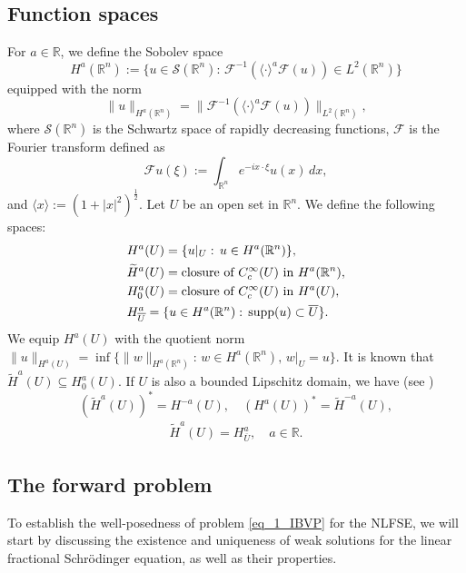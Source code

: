 \documentclass [oneside,11pt] {amsart}
\numberwithin{equation}{section}
\newcommand{\R}{\mathbb{R}}
\newcommand{\supp}{\mathrm{supp}}
\newcommand{\dx}{\,dx}
\begin{document}
\subsection{Function spaces}
For $a\in \R$, we define the Sobolev space 
$$
H^a(\R^n):=\{u\in \mathcal{S}(\R^n):\, \mathcal{F}^{-1}(\langle \cdot\rangle^a\mathcal{F}(u))\in L^2(\R^n)\}
$$
equipped with the norm
\[
\|u\|_{H^a(\R^n)} = \|\mathcal{F}^{-1}(\langle \cdot\rangle^a\mathcal{F}(u))\|_{L^2(\R^n)},
\]
where $\mathcal{S}(\R^n)$ is the Schwartz space of rapidly decreasing functions, $\mathcal{F}$ is the Fourier transform defined as 
\[
\mathcal{F}u(\xi) := \int_{\R^n} e^{-ix\cdot\xi}u(x)\dx ,
\]
and $\langle x\rangle:=(1+|x|^2)^{\frac{1}{2}}$.
Let $U$ be an open set in $\R^n$. We define the following spaces:
\begin{align*}
&H^a(U) = \{u|_{U}: \, u\in H^a(\R^n)\},\\
&\widetilde{H}^a(U) = \hbox{closure of } C^\infty_c(U) \hbox{ in } H^a(\R^n),\\
&H^a_0(U) =  \hbox{closure of } C^\infty_c(U) \hbox{ in } H^a(U),\\
&H^a_{\overline{U}} = \{u\in H^a(\R^n):\,\supp(u)\subset \overline{U}\}.
\end{align*}
We equip $H^a(U)$ with the quotient norm $\|u\|_{H^a(U)} = \inf \{\|w\|_{H^a(\R^n)}:\, w\in H^a(\R^n),\, w|_{U} = u\}$. It is known that $\widetilde{H}^a(U) \subseteq H^a_0(U)$. 
If $U$ is also a bounded Lipschitz domain, we have (see \cite{mclean_strongly_2000})
$$
(\widetilde{H}^a(U))^* = H^{-a}(U), \quad (H^{a}(U))^* = \widetilde{H}^{-a}(U),
$$
\begin{align*}
\widetilde{H}^a(U) = H^a_{\overline{U}},\quad a\in \R.
\end{align*}





\subsection{The forward problem}
To establish the well-posedness of problem \eqref{eq_1_IBVP} for the NLFSE, we will start by discussing the existence and uniqueness of weak solutions for the linear fractional Schr\"odinger equation, as well as their properties.
\end{document}
